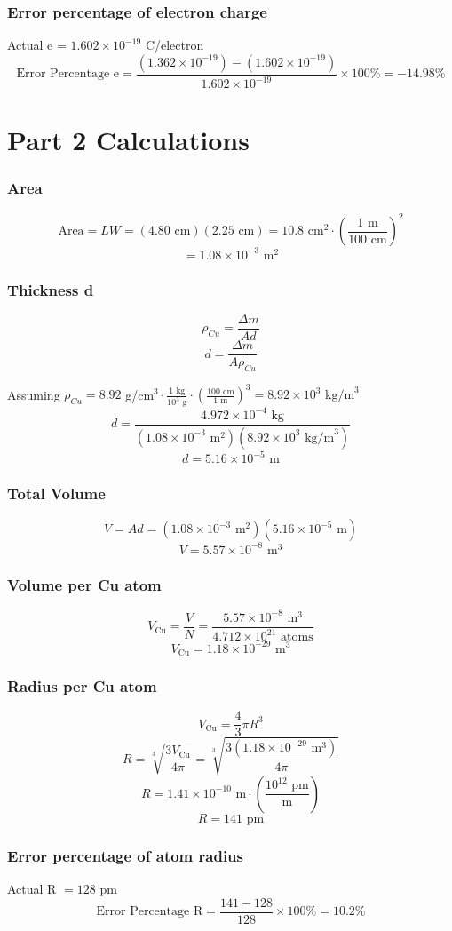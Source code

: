 \documentclass[fleqn]{article}
\begin{document}
\subsubsection*{Error percentage of electron charge}
Actual e = $1.602 \times 10^{-19}$ C/electron
\[ \text{Error Percentage e}=\frac{(1.362 \times 10^{-19}) - (1.602 \times 10^{-19})}{1.602 \times 10^{-19}} \times 100 \% = \boxed{-14.98\%}\]

\section*{Part 2 Calculations}
\subsubsection*{Area}
\[ \text{Area}=LW=(4.80 \text{ cm})(2.25 \text{ cm})=10.8 \text{ cm}^2 \cdot \left( \frac{1 \text{ m}}{100 \text{ cm}} \right)^2\]
\[= \boxed{ 1.08 \times 10^{-3} \text{ m}^2 }\]

\subsubsection*{Thickness d}
\[ \rho _{Cu} = \frac{\Delta m}{Ad} \]
\[ d = \frac{\Delta m}{A \rho _{Cu} } \]

Assuming $\rho _{Cu}  =8.92$ g/cm$^3
	\cdot \frac{1 \text{ kg}}{10^3 \text{ g}}
	\cdot \left( \frac{100 \text{ cm}}{1 \text{ m}} \right)^3 = 8.92 \times 10^{3} \text{ kg/m}^3
$
\[ d =
	\frac{4.972 \times 10^{-4} \text{ kg} }
	{
		(1.08 \times 10^{-3} \text{ m}^2)
		(8.92 \times 10^{3} \text{ kg/m}^3)
	}
\]
\[ \boxed{d=5.16 \times 10^{-5} \text{ m}} \]

\subsubsection*{Total Volume}
\[ V  = Ad = (1.08 \times 10^{-3} \text{ m}^2)(5.16 \times 10^{-5} \text{ m})  \]
\[ \boxed{V = 5.57 \times 10^{-8} \text{ m}^3  }\]

\subsubsection*{Volume per Cu atom}
\[ V_{\text{Cu}} = \frac{V}{N} =
	\frac{5.57 \times 10^{-8} \text{ m}^3}
	{4.712 \times 10^{21} \text{ atoms}}
\]
\[ \boxed{V _{\text{Cu}} = 1.18 \times 10^{-29} \text{ m}^3  }\]

\subsubsection*{Radius per Cu atom}
\[ V _{\text{Cu}} = \frac{4}{3} \pi R^3  \]
\[ R = \sqrt[3]{\frac{
			{3 V _{\text{Cu} }}}
		{4 \pi}
	}
	= \sqrt[3]{
		\frac{3(1.18 \times 10^{-29} \text{ m}^3)}
		{4 \pi}
	}
\]
\[ {R = 1.41 \times 10^{-10} \text{ m}} \cdot
	(\frac{10^{12} \text{ pm}}{\text{m}})
\]
\[ \boxed{R = 141 \text{ pm}} \]

\subsubsection*{Error percentage of atom radius}
Actual R $=128$ pm
\[ \text{Error Percentage R} =
	\frac{141 - 128}{128} \times 100 \% = \boxed{ 10.2 \%}
\]
\end{document}
